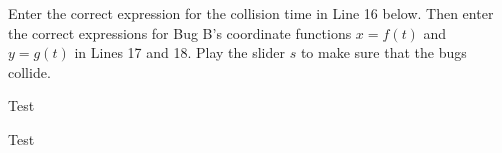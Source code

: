 \documentclass{ximera}
\begin{document}
\begin{exploration}\label{exp:pc1c}
Enter the correct expression for the collision time in Line 16 below. Then enter the correct expressions for Bug B's coordinate functions $x=f(t)$ and $y=g(t)$ in Lines 17 and 18. Play the slider $s$ to make sure that the bugs collide.

 
\begin{onlineOnly}
    \begin{center}
\end{center}
\end{onlineOnly}
\end{exploration}
















\begin{example}
Test
\end{example}


\begin{explanation}
Test
\end{explanation}


\end{document}
